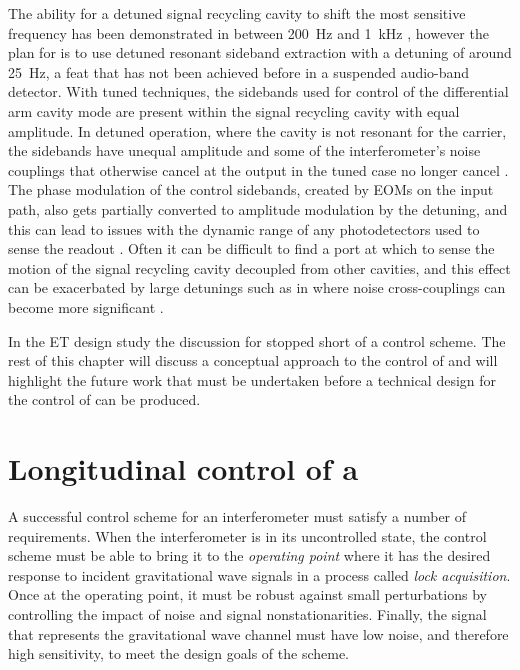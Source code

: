 The ability for a detuned signal recycling cavity to shift the most sensitive frequency has been demonstrated in \GEO{} between \SI{200}{\hertz} and \SI{1}{\kilo\hertz} \cite{Hild2006}, however the plan for \ETLF{} is to use detuned resonant sideband extraction with a detuning of around \SI{25}{\hertz}, a feat that has not been achieved before in a suspended audio-band detector. With tuned techniques, the sidebands used for control of the differential arm cavity mode are present within the signal recycling cavity with equal amplitude. In detuned operation, where the cavity is not resonant for the carrier, the sidebands have unequal amplitude and some of the interferometer's noise couplings that otherwise cancel at the output in the tuned case no longer cancel \cite{Hild2007}. The phase modulation of the control sidebands, created by \glspl{EOM} on the input path, also gets partially converted to amplitude modulation by the detuning, and this can lead to issues with the dynamic range of any photodetectors used to sense the readout \cite{Grote2007}. Often it can be difficult to find a port at which to sense the motion of the signal recycling cavity decoupled from other cavities, and this effect can be exacerbated by large detunings such as in \ETLF{} where noise cross-couplings can become more significant \cite{Hild2007}.

In the \gls{ET} design study the discussion for \ETLF{} stopped short of a control scheme. The rest of this chapter will discuss a conceptual approach to the control of \ETLF{} and will highlight the future work that must be undertaken before a technical design for the control of \ETLF{} can be produced.

\section{\label{sec:multi-dof-control}Longitudinal control of a \DRFPMI{}}
A successful control scheme for an interferometer must satisfy a number of requirements. When the interferometer is in its uncontrolled state, the control scheme must be able to bring it to the \emph{operating point} where it has the desired response to incident gravitational wave signals in a process called \emph{lock acquisition}. Once at the operating point, it must be robust against small perturbations by controlling the impact of noise and signal nonstationarities. Finally, the signal that represents the gravitational wave channel must have low noise, and therefore high sensitivity, to meet the design goals of the scheme.

